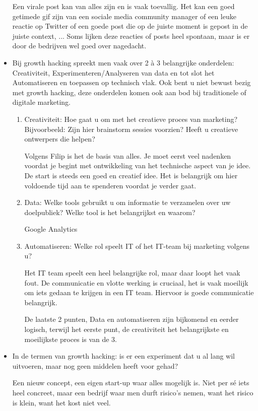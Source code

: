 \begin{itemize}
Een virale post kan van alles zijn en is vaak toevallig. Het kan een goed getimede gif zijn van een sociale media community manager of een leuke reactie op Twitter of een goede post die op de juiste moment is gepost in de juiste context, ... Soms lijken deze reacties of posts heel spontaan, maar is er door de bedrijven wel goed over nagedacht.
	
	\item Bij growth hacking spreekt men vaak over 2 à 3 belangrijke onderdelen: Creativiteit, Experimenteren/Analyseren van data en tot slot het Automatiseren en toepassen op technisch vlak. Ook bent u niet bewust bezig met growth hacking, deze onderdelen komen ook aan bod bij traditionele of digitale marketing.
	\begin{enumerate}[label*=\arabic*.]
		\item Creativiteit: Hoe gaat u om met het creatieve proces van marketing? Bijvoorbeeld: Zijn hier brainstorm sessies voorzien? Heeft u creatieve ontwerpers die helpen?
		
		Volgens Filip is het de basis van alles. Je moet eerst veel nadenken voordat je begint met ontwikkeling van het technische aspect van je idee. De start is steeds een goed en creatief idee. Het is belangrijk om hier voldoende tijd aan te spenderen voordat je verder gaat.
		
		\item Data: Welke tools gebruikt u om informatie te verzamelen over uw doelpubliek? Welke tool is het belangrijkst en waarom?
		
		Google Analytics
		
		\item Automatiseren: Welke rol speelt IT of het IT-team bij marketing volgens u? 
		
		Het IT team speelt een heel belangrijke rol, maar daar loopt het vaak fout. De communicatie en vlotte werking is cruciaal, het is vaak moeilijk om iets gedaan te krijgen in een IT team. Hiervoor is goede communicatie belangrijk.
		
		De laatste 2 punten, Data en automatiseren zijn bijkomend en eerder logisch, terwijl het eerste punt, de creativiteit het belangrijkste en moeilijkste proces is van de 3.
		
	\end{enumerate}
	\item In de termen van growth hacking: is er een experiment dat u al lang wil uitvoeren, maar nog geen middelen heeft voor gehad?
	
	Een nieuw concept, een eigen start-up waar alles mogelijk is. Niet per sé iets heel concreet, maar een bedrijf waar men durft risico's nemen, want het risico is klein, want het kost niet veel.
	

\end{itemize}
